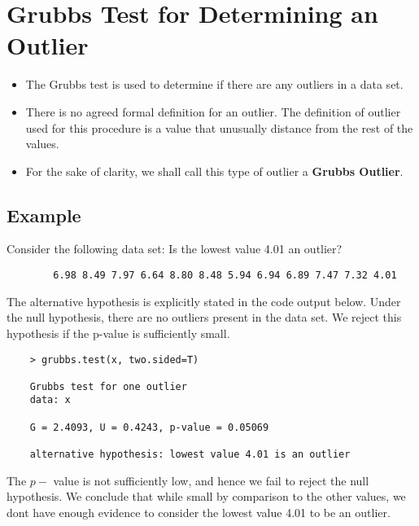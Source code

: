\documentclass[a4paper,12pt]{article}
\begin{document}
\section*{Grubbs Test for Determining an Outlier}
\begin{itemize}
    \item The Grubbs test is used to determine if there are any outliers in a data set.\item There is no agreed formal definition for an outlier. The definition of outlier used for this procedure is a value that unusually distance from the rest of the values. \item For the sake of clarity, we shall call this type of outlier a \textbf{Grubbs Outlier}.
\end{itemize}	
	
\subsection*{Example}	
	Consider the following data set: Is the lowest value 4.01 an outlier?
	\begin{framed}
		\begin{verbatim}
		6.98 8.49 7.97 6.64	8.80 8.48 5.94 6.94 6.89 7.47 7.32 4.01
		\end{verbatim}
	\end{framed}
	
\noindent The alternative hypothesis is explicitly stated in the code output below. Under the null hypothesis, there are no outliers present in the data set. We reject this hypothesis if the p-value is sufficiently small.
	
\begin{framed}
	\begin{verbatim}
	> grubbs.test(x, two.sided=T)
	
	Grubbs test for one outlier
	data: x
	
	G = 2.4093, U = 0.4243, p-value = 0.05069
	
	alternative hypothesis: lowest value 4.01 is an outlier
	\end{verbatim}
\end{framed}	
\noindent The $p-$ value is not sufficiently low, and hence we fail to reject the null hypothesis. We conclude that while small by comparison to the other values, we dont have enough evidence to consider the lowest value 4.01 to be an outlier. 
	
\end{document}
